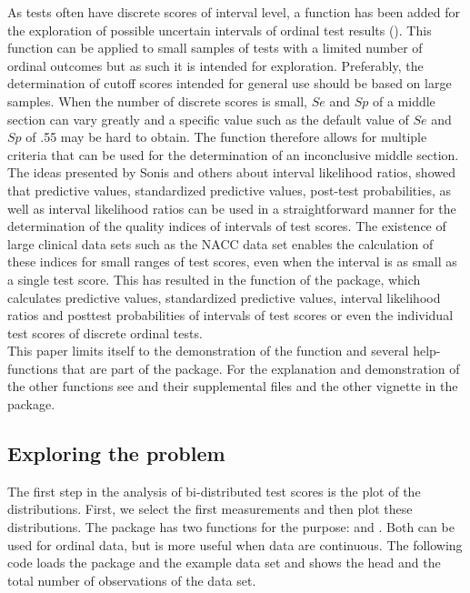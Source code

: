 \documentclass[
  nojss]{jss}
\begin{document}
As tests often have discrete scores of interval level, a function has
been added for the exploration of possible uncertain intervals of
ordinal test results (). This function can be applied
to small samples of tests with a limited number of ordinal outcomes but
as such it is intended for exploration. Preferably, the determination of
cutoff scores intended for general use should be based on large samples.
When the number of discrete scores is small, \(Se\) and \(Sp\) of a
middle section can vary greatly and a specific value such as the default
value of \(Se\) and \(Sp\) of .55 may be hard to obtain. The
 function therefore allows for multiple criteria that
can be used for the determination of an inconclusive middle section.\\
The ideas presented by Sonis \citeyearpar{sonis_how_1999} and others
\citep{brown_interval_2003, gallagher_clinical_1998} about interval
likelihood ratios, showed that predictive values, standardized
predictive values, post-test probabilities, as well as interval
likelihood ratios can be used in a straightforward manner for the
determination of the quality indices of intervals of test scores. The
existence of large clinical data sets such as the NACC data set enables
the calculation of these indices for small ranges of test scores, even
when the interval is as small as a single test score. This has resulted
in the  function of the  package, which
calculates predictive values, standardized predictive values, interval
likelihood ratios and posttest probabilities of intervals of test scores
or even the individual test scores of discrete ordinal tests.\\
This paper limits itself to the demonstration of the  function
and several help-functions that are part of the 
package. For the explanation and demonstration of the other functions
see \citep{landsheer_interval_2016, landsheer_clinical_2018} and their
supplemental files and the other vignette in the 
package.

\hypertarget{exploring-the-problem}{%
\subsection{Exploring the problem}\label{exploring-the-problem}}

The first step in the analysis of bi-distributed test scores is the plot
of the distributions. First, we select the first measurements and then
plot these distributions. The  package has two
functions for the purpose:  and . Both can
be used for ordinal data, but  is more useful when data are
continuous. The following code loads the package and the example data
set and shows the head and the total number of observations of the data
set.
\end{document}

